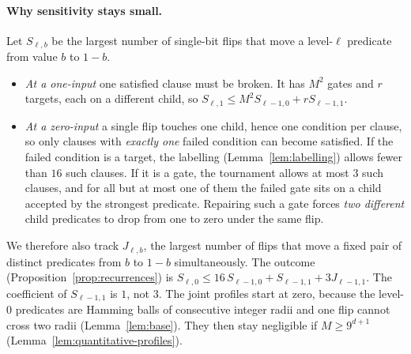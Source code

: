 \documentclass[11pt]{article}
\theoremstyle{definition}
\theoremstyle{remark}
\begin{document}
\paragraph{Why sensitivity stays small.}
Let \(S_{\ell,b}\) be the largest number of single-bit flips that move a
level-\(\ell\) predicate from value \(b\) to \(1-b\).
\begin{itemize}[leftmargin=2em]
\item \emph{At a one-input} one satisfied clause must be broken. It has \(M^2\) gates
and \(r\) targets, each on a different child, so
\(S_{\ell,1}\le M^2S_{\ell-1,0}+rS_{\ell-1,1}\).
\item \emph{At a zero-input} a single flip touches one child, hence one
condition per clause, so only clauses with \emph{exactly one} failed condition
can become satisfied. If the failed condition is a target, the labelling
(Lemma~\ref{lem:labelling}) allows fewer than \(16\) such clauses. If it is a gate,
the tournament allows at most \(3\) such clauses, and for all but at most one
of them the failed gate sits on a child accepted by the strongest predicate.
Repairing such a gate forces \emph{two different} child predicates to drop from one to
zero under the same flip.
\end{itemize}
We therefore also track \(J_{\ell,b}\), the largest number of flips that move
a fixed pair of distinct predicates from \(b\) to \(1-b\) simultaneously.
The outcome (Proposition~\ref{prop:recurrences}) is
\(S_{\ell,0}\le 16\,S_{\ell-1,0}+S_{\ell-1,1}+3J_{\ell-1,1}\).
The coefficient of \(S_{\ell-1,1}\) is \(1\), not \(3\).
The joint profiles start at zero, because the level-\(0\) predicates are Hamming
balls of consecutive integer radii and one flip cannot cross two radii
(Lemma~\ref{lem:base}). They then stay negligible if \(M\ge9^{d+1}\)
(Lemma~\ref{lem:quantitative-profiles}).
\end{document}
